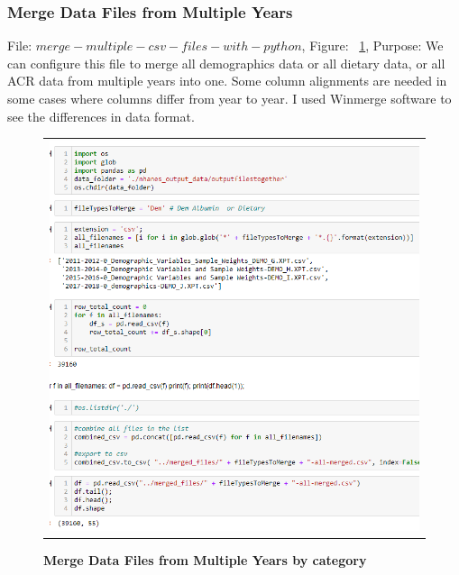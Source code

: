 \subsubsection{Merge Data Files from Multiple Years }
\flushleft \justifying File: $merge-multiple-csv-files-with-python$, Figure: ~\ref{merge-data-files}, Purpose: We can configure this file to merge all demographics data or all dietary data, or all ACR data from multiple years into one. Some column alignments are needed in some cases where columns differ from year to year. I used Winmerge software to see the differences in data format.
\begin{figure}[!htb]
\begin{tabular}{c}
\includegraphics[scale=1]{images/datasetgenerationcode/merge-demographics-files.png} \\
\end{tabular}
\caption{\textbf{Merge Data Files from Multiple Years by category}}
\label{merge-data-files}
\vspace{0.25cm}
\end{figure}

